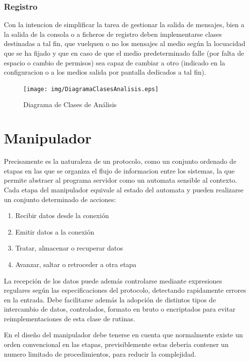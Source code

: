 \documentclass[a4paper,spanish,12pt]{book}
\begin{document}
\subsubsection{Registro}
Con la intencion de simplificar la tarea de gestionar la salida de mensajes, bien a la salida de la consola o a ficheros de registro deben implementarse clases destinadas a tal fin, que vuelquen o no los mensajes al medio según la locuacidad que se ha fijado y que en caso de que el medio predeterminado falle (por falta de espacio o cambio de permisos) sea capaz de cambiar a otro (indicado en la configuracion o a los medios salida por pantalla dedicados a tal fin).


\begin{figure}[h]
	\texttt{[image: img/DiagramaClasesAnalisis.eps]}
              \caption{Diagrama de Clases de Análisis}
     \label{fig:DiagramaClasesAnalisis}
\end{figure}


\section{Manipulador}
Precisamente es la naturaleza de un protocolo, como un conjunto ordenado de etapas en las que se organiza el flujo de informacion entre los sistemas, la que permite abstraer al programa servidor como un automata sensible al contexto. Cada etapa del manipulador equivale al estado del automata y pueden realizarse un conjunto determinado de acciones:
\begin{enumerate}
	\item Recibir datos desde la conexión
	\item Emitir datos a la conexión
	\item Tratar, almacenar o recuperar datos
	\item Avanzar, saltar o retroceder a otra etapa
\end{enumerate}

La recepción de los datos puede además controlarse mediante expresiones regulares según las especificaciones del protocolo, detectando rapidamente errores en la entrada. Debe facilitarse además la adopción de distintos tipos de intercambio de datos, controlados, formato en bruto o encriptados para evitar reimplementaciones de esta clase de rutinas.

En el diseño del manipulador debe tenerse en cuenta que normalmente existe un orden convencional en las etapas, previsiblemente estas deberia contener un numero limitado de procedimientos, para reducir la complejidad.
\end{document}
